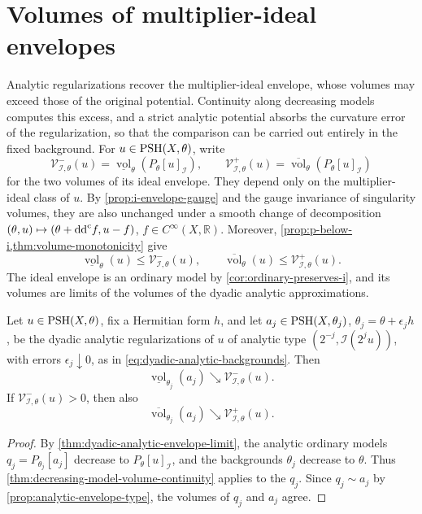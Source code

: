 \section{Volumes of multiplier-ideal envelopes}
\label{sec:ideal-volume-approximation}

Analytic regularizations recover the multiplier-ideal envelope, whose volumes may exceed those of the original potential. Continuity along decreasing models computes this excess, and a strict analytic potential absorbs the curvature error of the regularization, so that the comparison can be carried out entirely in the fixed background. For $u\in\mathrm{PSH}(X,\theta)$, write
\[
 \mathcal V^-_{\mathcal I,\theta}(u)
   =\underline{\operatorname{vol}}_\theta(P_\theta[u]_{\mathcal I}),\qquad
 \mathcal V^+_{\mathcal I,\theta}(u)
   =\overline{\operatorname{vol}}_\theta(P_\theta[u]_{\mathcal I})
\]
for the two volumes of its ideal envelope. They depend only on the multiplier-ideal class of $u$. By \cref{prop:i-envelope-gauge} and the gauge invariance of singularity volumes, they are also unchanged under a smooth change of decomposition $(\theta,u)\mapsto(\theta+\mathrm{dd}^{\mathrm{c}} f,u-f)$, $f\in C^\infty(X,\mathbb R)$. Moreover, \cref{prop:p-below-i,thm:volume-monotonicity} give
\[
 \underline{\operatorname{vol}}_\theta(u)
 \leq\mathcal V^-_{\mathcal I,\theta}(u),\qquad
 \overline{\operatorname{vol}}_\theta(u)
 \leq\mathcal V^+_{\mathcal I,\theta}(u).
\]
The ideal envelope is an ordinary model by \cref{cor:ordinary-preserves-i}, and its volumes are limits of the volumes of the dyadic analytic approximations.

\begin{corollary}\label{cor:dyadic-ideal-volume-limit}
Let $u\in\mathrm{PSH}(X,\theta)$, fix a Hermitian form $h$, and let $a_j\in\mathrm{PSH}(X,\theta_j)$, $\theta_j=\theta+\epsilon_jh$, be the dyadic analytic regularizations of $u$ of analytic type $(2^{-j},\mathcal I(2^ju))$, with errors $\epsilon_j\downarrow0$, as in \eqref{eq:dyadic-analytic-backgrounds}. Then
\[
 \underline{\operatorname{vol}}_{\theta_j}(a_j)
       \searrow\mathcal V^-_{\mathcal I,\theta}(u).
\]
If $\mathcal V^-_{\mathcal I,\theta}(u)>0$, then also
\[
 \overline{\operatorname{vol}}_{\theta_j}(a_j)
       \searrow\mathcal V^+_{\mathcal I,\theta}(u).
\]
\end{corollary}
\begin{proof}
By \cref{thm:dyadic-analytic-envelope-limit}, the analytic ordinary models $q_j=P_{\theta_j}[a_j]$ decrease to $P_\theta[u]_{\mathcal I}$, and the backgrounds $\theta_j$ decrease to $\theta$. Thus \cref{thm:decreasing-model-volume-continuity} applies to the $q_j$. Since $q_j\sim a_j$ by \cref{prop:analytic-envelope-type}, the volumes of $q_j$ and $a_j$ agree.
\end{proof}

